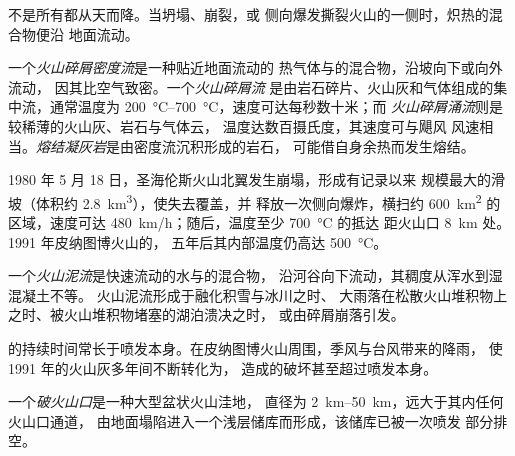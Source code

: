 不是所有都从天而降。当坍塌、崩裂，或
侧向爆发撕裂火山的一侧时，炽热的混合物便沿
地面流动。

\begin{definition}[火山碎屑密度流]\label{def:b2:eruptive-styles:pdc}
一个\emph{火山碎屑密度流}是一种贴近地面流动的
热气体与的混合物，沿坡向下或向外流动，
因其比空气致密。一个\emph{火山碎屑流}
是由岩石碎片、火山灰和气体组成的集中流，通常温度为
\qtyrange{200}{700}{\celsius}，速度可达每秒数十米；而
\emph{火山碎屑涌流}则是较稀薄的火山灰、岩石与气体云，
温度达数百摄氏度，其速度可与飓风
风速相当。\emph{熔结凝灰岩}是由密度流沉积形成的岩石，
可能借自身余热而发生熔结。
\end{definition}

1980 年 5 月 18 日，圣海伦斯火山北翼发生崩塌，形成有记录以来
规模最大的滑坡（体积约 \qty{2.8}{km^3}），使失去覆盖，并
释放一次侧向爆炸，横扫约 \qty{600}{km^2} 的区域，速度可达
\qty{480}{km/h}；随后，温度至少 \qty{700}{\celsius} 的抵达
距火山口 \qty{8}{km} 处。1991 年皮纳图博火山的，
五年后其内部温度仍高达 \qty{500}{\celsius}。

\begin{definition}[火山泥流]\label{def:b2:eruptive-styles:lahar}
一个\emph{火山泥流}是快速流动的水与的混合物，
沿河谷向下流动，其稠度从浑水到湿混凝土不等。
火山泥流形成于融化积雪与冰川之时、
大雨落在松散火山堆积物上之时、被火山堆积物堵塞的湖泊溃决之时，
或由碎屑崩落引发。
\end{definition}

的持续时间常长于喷发本身。在皮纳图博火山周围，季风与台风带来的降雨，
使 1991 年的火山灰多年间不断转化为，
造成的破坏甚至超过喷发本身。

\begin{definition}[破火山口]\label{def:b2:eruptive-styles:caldera}
一个\emph{破火山口}是一种大型盆状火山洼地，
直径为 \qtyrange{2}{50}{km}，远大于其内任何火山口通道，
由地面塌陷进入一个浅层储库而形成，该储库已被一次喷发
部分排空。
\end{definition}


